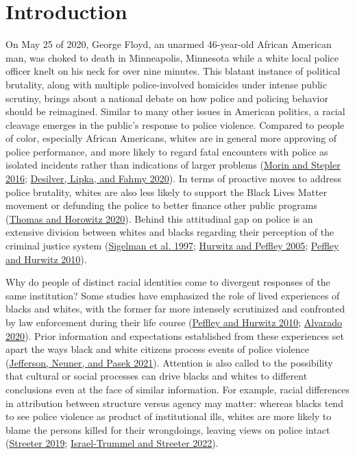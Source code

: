 \documentclass[
  12pt,
]{article}
\begin{document}
\hypertarget{introduction}{%
\section{Introduction}\label{introduction}}

On May 25 of 2020, George Floyd, an unarmed 46-year-old African American
man, was choked to death in Minneapolis, Minnesota while a white local
police officer knelt on his neck for over nine minutes. This blatant
instance of political brutality, along with multiple police-involved
homicides under intense public scrutiny, brings about a national debate
on how police and policing behavior should be reimagined. Similar to
many other issues in American politics, a racial cleavage emerges in the
public's response to police violence. Compared to people of color,
especially African Americans, whites are in general more approving of
police performance, and more likely to regard fatal encounters with
police as isolated incidents rather than indications of larger problems
(\protect\hyperlink{ref-morin2016}{Morin and Stepler 2016};
\protect\hyperlink{ref-desilver}{Desilver, Lipka, and Fahmy 2020}). In
terms of proactive moves to address police brutality, whites are also
less likely to support the Black Lives Matter movement or defunding the
police to better finance other public programs
(\protect\hyperlink{ref-thomas}{Thomas and Horowitz 2020}). Behind this
attitudinal gap on police is an extensive division between whites and
blacks regarding their perception of the criminal justice system
(\protect\hyperlink{ref-sigelman1997}{Sigelman et al. 1997};
\protect\hyperlink{ref-hurwitz2005}{Hurwitz and Peffley 2005};
\protect\hyperlink{ref-peffley2010}{Peffley and Hurwitz 2010}).

Why do people of distinct racial identities come to divergent responses
of the same institution? Some studies have emphasized the role of lived
experiences of blacks and whites, with the former far more intensely
scrutinized and confronted by law enforcement during their life course
(\protect\hyperlink{ref-peffley2010}{Peffley and Hurwitz 2010};
\protect\hyperlink{ref-alvarado2020}{Alvarado 2020}). Prior information
and expectations established from these experiences set apart the ways
black and white citizens process events of police violence
(\protect\hyperlink{ref-jefferson2021}{Jefferson, Neuner, and Pasek
2021}). Attention is also called to the possibility that cultural or
social processes can drive blacks and whites to different conclusions
even at the face of similar information. For example, racial differences
in attribution between structure versus agency may matter: whereas
blacks tend to see police violence as product of institutional ills,
whites are more likely to blame the persons killed for their
wrongdoings, leaving views on police intact
(\protect\hyperlink{ref-streeter2019}{Streeter 2019};
\protect\hyperlink{ref-israel-trummel2022}{Israel-Trummel and Streeter
2022}).
\end{document}
